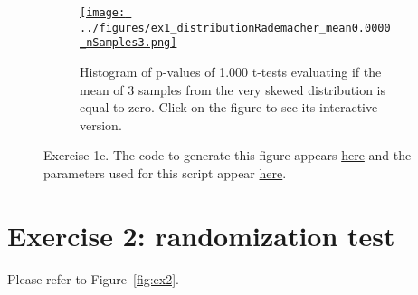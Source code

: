 \documentclass{article}
\begin{document}
\begin{enumerate}[(a)]
\begin{figure}
\begin{center}
                \begin{subfigure}{1.0\textwidth}
                    \centering
                    \href{https://www.gatsby.ucl.ac.uk/~rapela/neuroinformatics/2023/ws1/figures/ex1_distributionRademacher_mean0.0000_nSamples3.html}{\texttt{[image: ../figures/ex1\_distributionRademacher\_mean0.0000\_nSamples3.png]}}

                    \caption{Histogram of p-values of 1.000 t-tests evaluating if the mean
                    of 3 samples from the very skewed distribution is equal to zero.
                    Click on the figure to see its interactive version.}

                    \label{fig:ex1e_2}
                \end{subfigure}

                \caption{Exercise 1e.
                The code to generate this figure appears
                \href{https://github.com/joacorapela/neuroinformatics23/blob/master/worksheets/ws1/mySolution/code/scripts/doEx1.py}{here} and the
                parameters used for this script appear
                \href{https://github.com/joacorapela/neuroinformatics23/blob/master/worksheets/ws1/mySolution/code/scripts/doEx1e.csh}{here}.}
                \label{fig:ex1e}

            \end{center}
        \end{figure}

\end{enumerate}

\section*{Exercise 2: randomization test}

Please refer to Figure~\ref{fig:ex2}.
\end{document}
